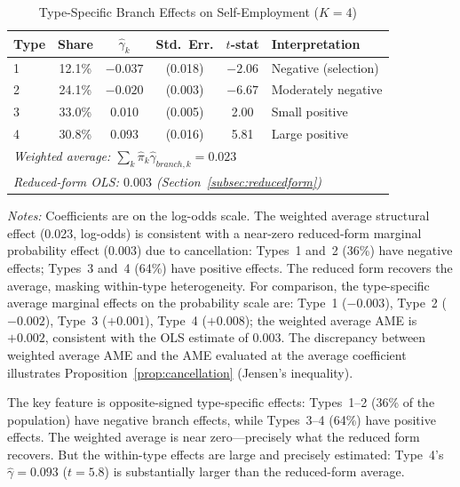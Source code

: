 \documentclass[12pt]{article}
\begin{document}
\begin{table}[H]
\centering
\caption{Type-Specific Branch Effects on Self-Employment ($K=4$)}
\label{tab:type_effects}
\begin{threeparttable}
\begin{tabular}{lccccl}
\toprule
Type & Share & $\hat{\gamma}_k$ & Std.\ Err. & $t$-stat & Interpretation \\
\midrule
1 & 12.1\% & $-0.037$ & (0.018) & $-2.06$ & Negative (selection) \\
2 & 24.1\% & $-0.020$ & (0.003) & $-6.67$ & Moderately negative \\
3 & 33.0\% & 0.010 & (0.005) & 2.00 & Small positive \\
4 & 30.8\% & 0.093 & (0.016) & 5.81 & Large positive \\
\midrule
\multicolumn{6}{l}{\textit{Weighted average: $\sum_k \hat{\pi}_k \hat{\gamma}_{branch,k} = 0.023$}} \\
\multicolumn{6}{l}{\textit{Reduced-form OLS: $0.003$ (Section~\ref{subsec:reducedform})}} \\
\bottomrule
\end{tabular}
\begin{tablenotes}
\small
\item \textit{Notes:} Coefficients are on the log-odds scale. The weighted average structural effect (0.023, log-odds) is consistent with a near-zero reduced-form marginal probability effect (0.003) due to cancellation: Types~1 and~2 (36\%) have negative effects; Types~3 and~4 (64\%) have positive effects. The reduced form recovers the average, masking within-type heterogeneity. For comparison, the type-specific average marginal effects on the probability scale are: Type~1 ($-0.003$), Type~2 ($-0.002$), Type~3 ($+0.001$), Type~4 ($+0.008$); the weighted average AME is $+0.002$, consistent with the OLS estimate of $0.003$. The discrepancy between weighted average AME and the AME evaluated at the average coefficient illustrates Proposition~\ref{prop:cancellation} (Jensen's inequality).
\end{tablenotes}
\end{threeparttable}
\end{table}

The key feature is opposite-signed type-specific effects: Types~1--2 (36\% of the population) have negative branch effects, while Types~3--4 (64\%) have positive effects. The weighted average is near zero---precisely what the reduced form recovers. But the within-type effects are large and precisely estimated: Type~4's $\hat{\gamma} = 0.093$ ($t = 5.8$) is substantially larger than the reduced-form average.
\end{document}
